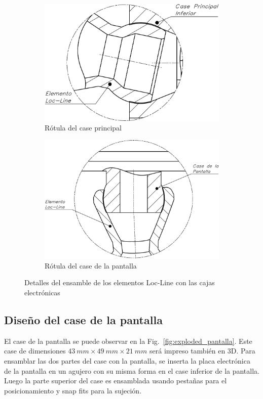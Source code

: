 \begin{figure}[hbt!]
\centering
\begin{subfigure}{.5\textwidth}
  \centering
  \includegraphics[width=0.9\linewidth]{rotula_principal.pdf}
  \caption{Rótula del case principal}
  \label{fig:rotula_principal}
\end{subfigure}%
\begin{subfigure}{.5\textwidth}
  \centering
  \includegraphics[width=\linewidth]{rotula_pantalla.pdf}
  \caption{Rótula del case de la pantalla}
  \label{fig:rotula_pantalla}
\end{subfigure}
\caption{Detalles del ensamble de los elementos Loc-Line con las cajas electrónicas}
\label{fig:rotulas}
\end{figure}


\subsection{Diseño del case de la pantalla}
El case de la pantalla se puede observar en la Fig.~\ref{fig:exploded_pantalla}. Este case de dimensiones $\SI{43}{mm} \times \SI{49}{mm} \times \SI{21}{mm}$ será impreso también en 3D. Para ensamblar las dos partes del case con la pantalla, se inserta la placa electrónica de la pantalla en un agujero con su misma forma en el case inferior de la pantalla. Luego la parte superior del case es ensamblada usando pestañas para el posicionamiento y snap fits para la sujeción.

